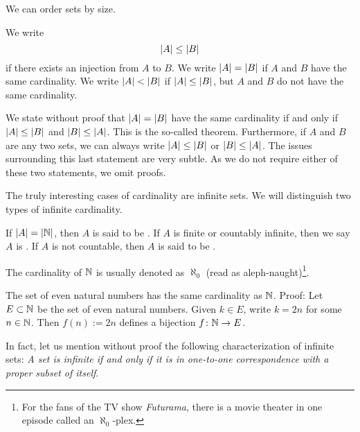 We can order sets by size.

\begin{defn} \label{def:comparecards}
We write
\begin{equation*}
\left\lvert {A} \right\rvert \leq \left\lvert {B} \right\rvert
\end{equation*}
if there exists an injection from $A$ to $B$.  We write $\left\lvert {A} \right\rvert = \left\lvert {B} \right\rvert$
if $A$ and $B$ have the same cardinality.  We write $\left\lvert {A} \right\rvert < \left\lvert {B} \right\rvert$
if $\left\lvert {A} \right\rvert \leq \left\lvert {B} \right\rvert$, but $A$ and $B$ do not have the same cardinality.
\end{defn}

We state without proof that
$\left\lvert {A} \right\rvert = \left\lvert {B} \right\rvert$ have the same cardinality if and only if
$\left\lvert {A} \right\rvert \leq \left\lvert {B} \right\rvert$ and
$\left\lvert {B} \right\rvert \leq \left\lvert {A} \right\rvert$.  This is the so-called
 theorem.
Furthermore, if $A$ and $B$ are any two sets,
we can always write $\left\lvert {A} \right\rvert \leq \left\lvert {B} \right\rvert$ or
$\left\lvert {B} \right\rvert \leq \left\lvert {A} \right\rvert$.  The issues surrounding this
last statement are very subtle.  As we do not require either
of these two statements, we omit proofs.

The truly interesting cases of cardinality are infinite sets.
We will distinguish two types of infinite cardinality.

\begin{defn}
If $\left\lvert {A} \right\rvert = \left\lvert {{\mathbb{N}}} \right\rvert$, then $A$ is said to be
\emph{}.
If $A$ is finite or countably infinite, then we say $A$
is \emph{}.
If $A$ is not countable, then
$A$ is said to be \emph{}.
\end{defn}

The cardinality of ${\mathbb{N}}$ is usually denoted as
$\aleph_0$ (read as aleph-naught)\footnote{For the fans of the TV show
\emph{Futurama}, there is a movie theater in one episode
called an $\aleph_0$-plex.}.

\begin{example}
The set of even natural numbers has the same cardinality as ${\mathbb{N}}$.  Proof:
Let $E \subset {\mathbb{N}}$ be the set of even natural numbers.
Given $k \in E$, write $k=2n$ for some $n \in {\mathbb{N}}$.
Then $f(n) := 2n$ defines a bijection $f \colon {\mathbb{N}} \to E$.
\end{example}

In fact, let us mention without proof the following characterization
of infinite sets: \emph{A set is infinite if and only if it is in one-to-one
correspondence with a proper subset of itself}.

